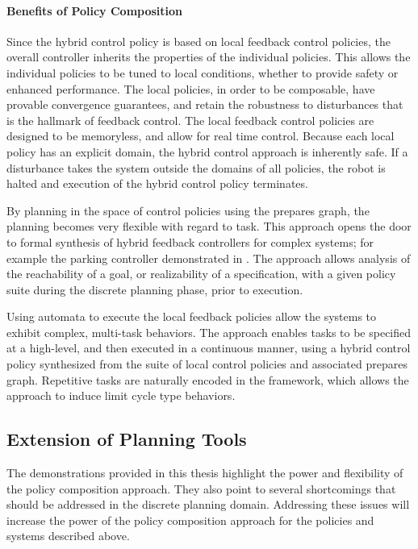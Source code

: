 
\paragraph{Benefits of Policy Composition}
Since the hybrid control policy is based on local feedback control policies, the
overall controller inherits the properties of the individual policies.  This allows
the individual policies to be tuned to local conditions, whether to provide safety or
enhanced performance.  The local policies, in order to be composable, have provable
convergence guarantees, and retain the robustness to disturbances that is the
hallmark of feedback control.  The local feedback control policies are designed to be
memoryless, and allow for real time control.  Because each local policy has an
explicit domain, the hybrid control approach is inherently safe.  If a disturbance
takes the system outside the domains of all policies, the robot is halted and
execution of the hybrid control policy terminates.

By planning in the space of control policies using the prepares graph, the planning
becomes very flexible with regard to task.  This approach opens the door to formal
synthesis of hybrid feedback controllers for complex systems; for example the parking
controller demonstrated in .
The approach allows analysis of the reachability of a goal, or realizability of a
specification, with a given policy suite during the discrete planning phase, prior to
execution.

Using automata to execute the local feedback policies allow the
systems to exhibit complex, multi-task behaviors.  The approach
enables tasks to be specified at a high-level, and then executed in a
continuous manner, using a hybrid control policy synthesized from the
suite of local control policies and associated prepares graph.
Repetitive tasks are naturally encoded in the framework, which allows
the approach to induce limit cycle type behaviors.


\subsection{Extension of Planning Tools}
\label{sec:extend_planning}

The demonstrations provided in this thesis highlight the power and flexibility of the
policy composition approach.  They also point to several shortcomings that should be
addressed in the discrete planning domain.  Addressing these issues will increase the
power of the policy composition approach for the policies and systems described
above.  

